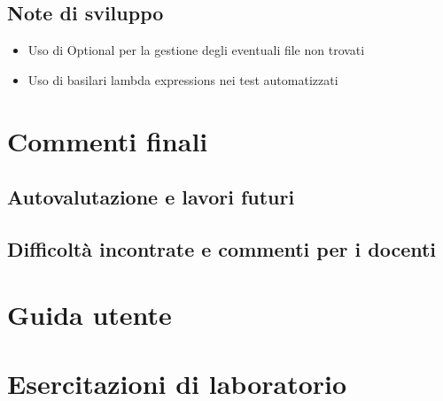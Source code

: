 \documentclass[a4paper,12pt]{report}
\begin{document}
    \section{Note di sviluppo}
    \begin{itemize}
            \item Uso di Optional per la gestione degli eventuali file non trovati
            \item Uso di basilari lambda expressions nei test automatizzati
    \end{itemize}
    \chapter{Commenti finali}
    \section{Autovalutazione e lavori futuri}
    \section{Difficoltà incontrate e commenti per i docenti}
    \appendix
    \chapter{Guida utente}
    \chapter{Esercitazioni di laboratorio}
    \printbibliography[heading=bibintoc]
\end{document}
